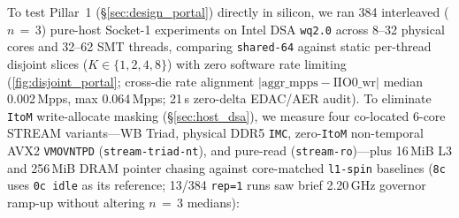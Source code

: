 To test Pillar~1 (\S\ref{sec:design_portal}) directly in silicon, we ran 384 interleaved ($n\,=\,3$) pure-host Socket-1 experiments on Intel DSA \texttt{wq2.0} across 8--32 physical cores and 32--62 SMT threads, comparing \texttt{shared-64} against static per-thread disjoint slices ($K \in \{1, 2, 4, 8\}$) with zero software rate limiting (\autoref{fig:disjoint_portal}; cross-die rate alignment $|\text{aggr\_mpps} - \text{IIO0\_wr}|$ median 0.002\,Mpps, max 0.064\,Mpps; 21\,s zero-delta EDAC/AER audit). To eliminate \texttt{ItoM} write-allocate masking (\S\ref{sec:host_dsa}), we measure four co-located 6-core STREAM variants---WB Triad, physical DDR5 \texttt{IMC}, zero-\texttt{ItoM} non-temporal AVX2 \texttt{VMOVNTPD} (\texttt{stream-triad-nt}), and pure-read (\texttt{stream-ro})---plus 16\,MiB L3 and 256\,MiB DRAM pointer chasing against core-matched \texttt{l1-spin} baselines (\texttt{8c} uses \texttt{0c idle} as its reference; 13/384 \texttt{rep=1} runs saw brief 2.20\,GHz governor ramp-up without altering $n\,=\,3$ medians):

